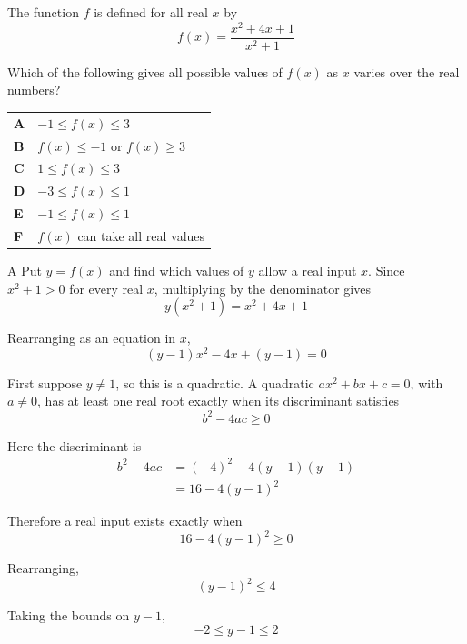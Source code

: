 \documentclass[11pt,a4paper]{article}
\begin{document}
\begin{enumerate}[label=\textbf{\arabic*.},leftmargin=*,itemsep=0pt,start=12]
\questionitem[Inequalities]
The function $f$ is defined for all real $x$ by
\[
f(x)=\frac{x^{2}+4x+1}{x^{2}+1}
\]

Which of the following gives all possible values of \(f(x)\) as \(x\) varies over the real numbers?

\par\vspace*{12pt}
\begin{tabularx}{\linewidth}{@{}>{\bfseries}l Y@{}}
A &
$-1 \le f(x) \le 3$
\\[0.8em]
B &
$f(x) \le -1$ or $f(x) \ge 3$
\\[0.8em]
C &
$1 \le f(x) \le 3$
\\[0.8em]
D &
$-3 \le f(x) \le 1$
\\[0.8em]
E &
$-1 \le f(x) \le 1$
\\[0.8em]
F &
$f(x)$ can take all real values
\\
\end{tabularx}

\begin{djsSolution}{A}
Put $y=f(x)$ and find which values of $y$ allow a real input $x$. Since $x^2+1>0$ for every real $x$, multiplying by the denominator gives
\[
y(x^2+1)=x^2+4x+1
\]

Rearranging as an equation in $x$,
\[
(y-1)x^2-4x+(y-1)=0
\]

First suppose $y\ne1$, so this is a quadratic. A quadratic $ax^2+bx+c=0$, with $a\ne0$, has at least one real root exactly when its discriminant satisfies
\[
b^2-4ac\ge0
\]

Here the discriminant is
\[
\begin{aligned}
b^2-4ac
&=(-4)^2-4(y-1)(y-1)\\[5pt]
&=16-4(y-1)^2
\end{aligned}
\]

Therefore a real input exists exactly when
\[
16-4(y-1)^2\ge0
\]

Rearranging,
\[
(y-1)^2\le4
\]

Taking the bounds on $y-1$,
\[
-2\le y-1\le2
\]


\end{djsSolution}
\end{enumerate}
\end{document}
